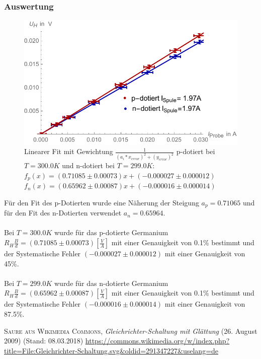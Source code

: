 \subsubsection{Auswertung}
\begin{figure}[H]
	\centering
\includegraphics[width=0.9\linewidth]{IMAGE/M31_Fit.pdf}
	\caption{Linearer Fit mit Gewichtung $\frac{1}{(a_{i}*x_{error})^2+(y_{error})^2}$ p-dotiert bei $T=300.0K$ und n-dotiert bei $T=299.0K$:\\ $f_{p}(x)=(0.71085 \pm 0.00073)x + (-0.000027 \pm 0.000012)$\\ $f_{n}(x)=(0.65962 \pm 0.00087)x + (-0.000016 \pm 0.000014)$}
	\label{fig:M3_1_1}
\end{figure} 


Für den Fit  des p-Dotierten wurde eine Näherung der Steigung  $a_{p}=0.71065$  und für den Fit des n-Dotierten verwendet $a_{n}=0.65964$.\\
\\
Bei $T=300.0K$ wurde für das p-dotierte Germanium  $R_{H}\frac{B}{d}=(0.71085 \pm 0.00073) [\frac{V}{A}]$ mit einer Genauigkeit von 0.1\% bestimmt und\\
der Systematische Fehler $(-0.000027 \pm 0.000012)$ mit einer Genauigkeit von 45\%.\\
\\
Bei $T=299.0K$ wurde für das n-dotierte Germanium $R_{H}\frac{B}{d}=(0.65962 \pm 0.00087) [\frac{V}{A}]$ mit einer Genauigkeit von 0.1\% bestimmt und\\ der Systematische Fehler $(-0.000016 \pm 0.000014)$ mit einer Genauigkeit von 87.5\%.\\


\listoffigures
\listoftables
\begin{thebibliography}{99}
	 \textsc{Saure aus Wikimedia Commons}, \emph{Gleichrichter-Schaltung mit Glättung} (26. August 2009) (Stand: 08.03.2018) \url{https://commons.wikimedia.org/w/index.php?title=File:Gleichrichter-Schaltung.svg&oldid=291347227&uselang=de}
\end{thebibliography}
